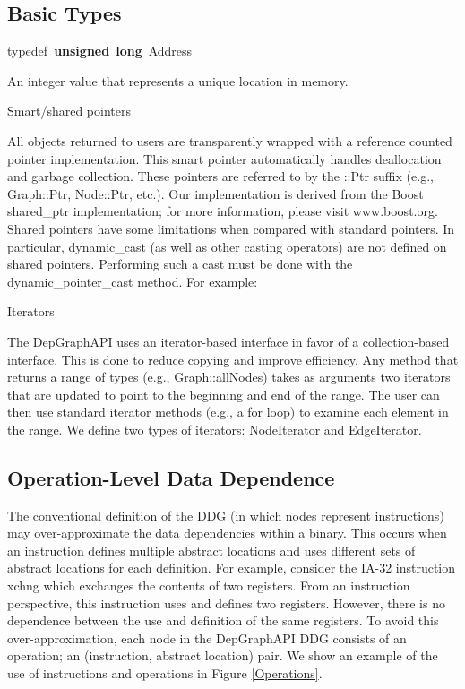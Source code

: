 \documentclass[12pt,titlepage]{article}
\begin{document}
\subsection{Basic Types}

{\ttfamily \raggedright \small
typedef\ \textbf{unsigned}\ \textbf{long}\ Address\\
 }
\normalfont\normalsize
\indent An integer value that represents a unique location in memory.

\noindent Smart/shared pointers

All objects returned to users are transparently wrapped with a
reference counted pointer implementation. This smart pointer
automatically handles deallocation and garbage collection. These
pointers are referred to by the ::Ptr suffix (e.g., Graph::Ptr,
Node::Ptr, etc.). Our implementation is derived from the Boost
shared\_ptr implementation; for more information, please visit
www.boost.org. Shared pointers have some limitations when compared
with standard pointers. In particular, dynamic\_cast (as well as other
casting operators) are not defined on shared pointers. Performing such
a cast must be done with the dynamic\_pointer\_cast method. For example:

\normalfont\normalsize

\noindent Iterators 

The DepGraphAPI uses an iterator-based interface in favor of a
collection-based interface. This is done to reduce copying and improve
efficiency. Any method that returns a range of types (e.g.,
Graph::allNodes) takes as arguments two iterators that are updated to
point to the beginning and end of the range. The user can then use
standard iterator methods (e.g., a for loop) to examine each element
in the range. We define two types of iterators: NodeIterator and
EdgeIterator.

\subsection{Operation-Level Data Dependence}

The conventional definition of the DDG (in which nodes represent
instructions) may over-approximate the data dependencies within a
binary. This occurs when an instruction defines multiple abstract
locations and uses different sets of abstract locations for each
definition. For example, consider the IA-32 instruction xchng which
exchanges the contents of two registers. From an instruction
perspective, this instruction uses and defines two registers. However,
there is no dependence between the use and definition of the same
registers. To avoid this over-approximation, each node in the
DepGraphAPI DDG consists of an operation; an (instruction, abstract
location) pair. We show an example of the use of instructions and
operations in Figure \ref{Operations}.
\end{document}

